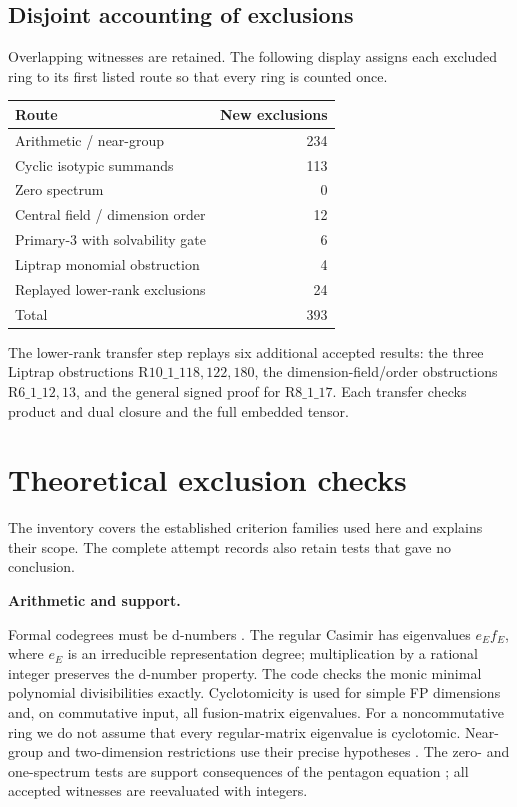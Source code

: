 \documentclass[11pt]{article}
\begin{document}
\subsection*{Disjoint accounting of exclusions}
Overlapping witnesses are retained. The following display assigns each excluded ring
to its first listed route so that every ring is counted once.
\begin{center}\begin{tabular}{lr}\toprule Route & New exclusions\\\midrule
Arithmetic / near-group & 234 \\
Cyclic isotypic summands & 113 \\
Zero spectrum & 0 \\
Central field / dimension order & 12 \\
Primary-3 with solvability gate & 6 \\
Liptrap monomial obstruction & 4 \\
Replayed lower-rank exclusions & 24 \\
\midrule Total & 393\\\bottomrule\end{tabular}\end{center}
The lower-rank transfer step replays six additional accepted results: the three
Liptrap obstructions $\mathrm{R10\_1\_118,122,180}$, the dimension-field/order obstructions
$\mathrm{R6\_1\_12,13}$, and the general signed proof for $\mathrm{R8\_1\_17}$.
Each transfer checks product and dual closure and the full embedded tensor.

\section{Theoretical exclusion checks}
The inventory covers the established criterion families used here and explains their scope.
The complete attempt records also retain tests that gave no conclusion.

\textbf{Arithmetic and support.}\par
Formal codegrees must be d-numbers \cite{Ostrik}. The regular Casimir has eigenvalues
$e_Ef_E$, where $e_E$ is an irreducible representation degree; multiplication by a
rational integer preserves the d-number property. The code checks the monic minimal
polynomial divisibilities exactly. Cyclotomicity is used for simple FP dimensions and,
on commutative input, all fusion-matrix eigenvalues. For a noncommutative ring we do
not assume that every regular-matrix eigenvalue is cyclotomic. Near-group and
two-dimension restrictions use their precise hypotheses \cite{Schopieray}.
The zero- and one-spectrum tests are support consequences of the pentagon equation
\cite{TPE}; all accepted witnesses are reevaluated with integers.
\end{document}

